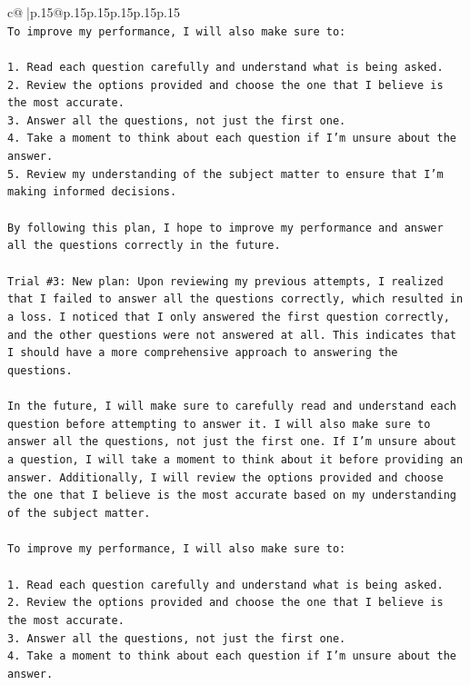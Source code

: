 \documentclass{article}
\begin{document}
{\begin{supertabular}{c@{$\;$}|p{.15\linewidth}@{}p{.15\linewidth}p{.15\linewidth}p{.15\linewidth}p{.15\linewidth}p{.15\linewidth}}
{{{\\ 
\texttt{To improve my performance, I will also make sure to:} \\
\\ 
\texttt{1. Read each question carefully and understand what is being asked.} \\
\texttt{2. Review the options provided and choose the one that I believe is the most accurate.} \\
\texttt{3. Answer all the questions, not just the first one.} \\
\texttt{4. Take a moment to think about each question if I'm unsure about the answer.} \\
\texttt{5. Review my understanding of the subject matter to ensure that I'm making informed decisions.} \\
\\ 
\texttt{By following this plan, I hope to improve my performance and answer all the questions correctly in the future.} \\
\\ 
\texttt{Trial \#3: New plan: Upon reviewing my previous attempts, I realized that I failed to answer all the questions correctly, which resulted in a loss. I noticed that I only answered the first question correctly, and the other questions were not answered at all. This indicates that I should have a more comprehensive approach to answering the questions.} \\
\\ 
\texttt{In the future, I will make sure to carefully read and understand each question before attempting to answer it. I will also make sure to answer all the questions, not just the first one. If I'm unsure about a question, I will take a moment to think about it before providing an answer. Additionally, I will review the options provided and choose the one that I believe is the most accurate based on my understanding of the subject matter.} \\
\\ 
\texttt{To improve my performance, I will also make sure to:} \\
\\ 
\texttt{1. Read each question carefully and understand what is being asked.} \\
\texttt{2. Review the options provided and choose the one that I believe is the most accurate.} \\
\texttt{3. Answer all the questions, not just the first one.} \\
\texttt{4. Take a moment to think about each question if I'm unsure about the answer.} \\
}}}
\end{supertabular}}
\end{document}
